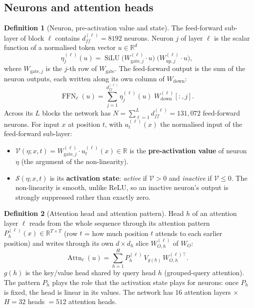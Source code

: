 \documentclass[10pt,a4paper]{article}
\newcommand{\op}[1]{\operatorname{#1}}
\theoremstyle{definition}
\newtheorem{definition}{Definition}[section]
\begin{document}
\subsection{Neurons and attention heads}
\begin{definition}[Neuron, pre-activation value and state]
The feed-forward sub-layer of block $\ell$ contains $d_{ff}^{(\ell)}=8192$ neurons. Neuron $j$ of layer $\ell$ is the scalar function of a normalised token vector $u\in\mathbb{R}^{d}$
\begin{equation}
  \eta^{(\ell)}_j(u) = \op{SiLU}\big(W^{(\ell)}_{\mathrm{gate},j}\cdot u\big)\;\big(W^{(\ell)}_{\mathrm{up},j}\cdot u\big),
\end{equation}
where $W_{\mathrm{gate},j}$ is the $j$-th row of $W_{\mathrm{gate}}$. The feed-forward output is the sum of the neuron outputs, each written along its own column of $W_{\mathrm{down}}$:
\begin{equation}
  \op{FFN}_\ell(u) = \sum_{j=1}^{d_{ff}^{(\ell)}} \eta^{(\ell)}_j(u)\;W^{(\ell)}_{\mathrm{down}}[:,j].
\end{equation}
Across its $L$ blocks the network has $N=\sum_{\ell=1}^{L} d_{ff}^{(\ell)}=131{,}072$ feed-forward neurons. For input $x$ at position $t$, with $u^{(\ell)}_t(x)$ the normalised input of the feed-forward sub-layer:
\begin{itemize}
\item $\mathcal{V}(\eta;x,t)=W^{(\ell)}_{\mathrm{gate},j}\cdot u^{(\ell)}_t(x)\in\mathbb{R}$ is the \textbf{pre-activation value} of neuron $\eta$ (the argument of the non-linearity).
\item $\mathcal{S}(\eta;x,t)$ is its \textbf{activation state}: \emph{active} if $\mathcal{V}>0$ and \emph{inactive} if $\mathcal{V}\le 0$. The non-linearity is smooth, unlike ReLU, so an inactive neuron's output is strongly suppressed rather than exactly zero.
\end{itemize}
\end{definition}
\begin{definition}[Attention head and attention pattern]
Head $h$ of an attention layer $\ell$ reads from the whole sequence through its attention pattern $P^{(\ell)}_h(x)\in\mathbb{R}^{T\times T}$ (row $t$ = how much position $t$ attends to each earlier position) and writes through its own $d\times d_h$ slice $W^{(\ell)}_{O,h}$ of $W_O$:
\begin{equation}
  \op{Attn}_\ell(u) = \sum_{h=1}^{H} P^{(\ell)}_h\,V_{g(h)}\,W^{(\ell)\top}_{O,h}.
\end{equation}
$g(h)$ is the key/value head shared by query head $h$ (grouped-query attention). The pattern $P_h$ plays the role that the activation state plays for neurons: once $P_h$ is fixed, the head is linear in its values. The network has 16 attention layers $\times$ $H=32$ heads $=512$ attention heads.
\end{definition}
\end{document}
